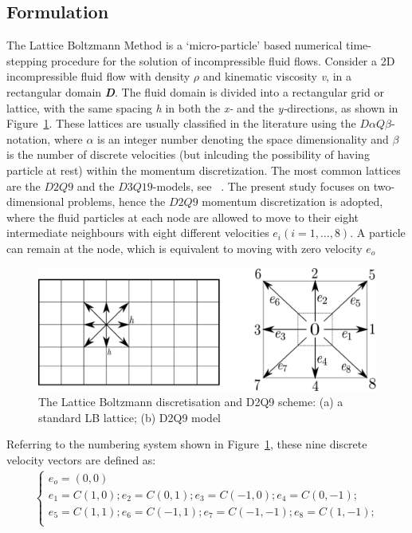 \subsection{Formulation}
The Lattice Boltzmann Method is a `micro-particle' based numerical time-stepping procedure for the solution of incompressible fluid flows. Consider a 2D incompressible fluid flow with density $\rho$ and kinematic viscosity \textit{v}, in a rectangular domain \textit{\textbf{D}}. The fluid domain is divided into a rectangular grid or lattice, with the same spacing \textit{h} in both the \textit{x-} and the \textit{y-}directions, as shown in Figure~\ref{fig:D2Q9}. These lattices are usually classified in the literature using the $\textit{D}\alpha\textit{Q}\beta$-notation, where $\alpha$ is an integer number denoting the space dimensionality and $\beta$ is the number of discrete velocities (but inlcuding the possibility of having particle at rest) within the momentum discretization. The most common lattices are the $\textit{D2Q9}$ and the $\textit{D3Q19}$-models, see ~\citet{he1997}. The present study focuses on two-dimensional problems, hence the $\textit{D2Q9}$ momentum discretization is adopted, where the fluid particles at each node are allowed to move to their eight intermediate neighbours with eight different velocities $\textit{e}_{\textit{i}} (\textit{i}=1,\dots,8)$. A particle can remain at the node, which is equivalent to moving with zero velocity $\textit{e}_{\textit{o}}$
\begin{figure}[htbp]
\centering
\includegraphics[scale=0.5]{Chapter3/figures/lbm/D2Q9.png}
\caption[The Lattice Boltzmann discretisation and D2Q9 scheme]{The Lattice Boltzmann discretisation and D2Q9 scheme: (a) a standard LB lattice; (b) D2Q9 model~\citep{han2007}}
\label{fig:D2Q9}
\end{figure}
Referring to the numbering system shown in Figure~\ref{fig:D2Q9}, these nine discrete velocity vectors are defined as:
\begin{align} 
\begin{cases}
\textit{e}_{\textit{o}}=(0,0)\\
\textit{e}_{\textit{1}}=\textit{C}(1,0); \textit{e}_{\textit{2}}=\textit{C}(0,1); \textit{e}_{\textit{3}}=\textit{C}(-1,0); \textit{e}_{\textit{4}}=\textit{C}(0,-1); \\
\textit{e}_{\textit{5}}=\textit{C}(1,1); \textit{e}_{\textit{6}}=\textit{C}(-1,1); \textit{e}_{\textit{7}}=\textit{C}(-1,-1); \textit{e}_{\textit{8}}=\textit{C}(1,-1); \\ 
\end{cases}
\end{align}
